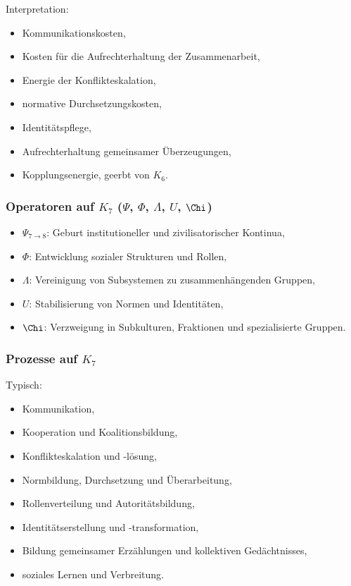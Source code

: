 Interpretation:
\begin{itemize}
    \item Kommunikationskosten,
    \item Kosten für die Aufrechterhaltung der Zusammenarbeit,
    \item Energie der Konflikteskalation,
    \item normative Durchsetzungskosten,
    \item Identitätspflege,
    \item Aufrechterhaltung gemeinsamer Überzeugungen,
    \item Kopplungsenergie, geerbt von $K_6$.
\end{itemize}

\subsubsection{Operatoren auf \texorpdfstring{$K_7$}{K_7} (\texorpdfstring{$\Psi$}{\Psi}, \texorpdfstring{$\Phi$}{\Phi}, \texorpdfstring{$\Lambda$}{\Lambda}, \texorpdfstring{$U$}{U}, \texorpdfstring{$\Chi$}{\Chi})}

\begin{itemize}
    \item $\Psi_{7\to8}$: Geburt institutioneller und zivilisatorischer Kontinua,
    \item $\Phi$: Entwicklung sozialer Strukturen und Rollen,
    \item $\Lambda$: Vereinigung von Subsystemen zu zusammenhängenden Gruppen,
    \item $U$: Stabilisierung von Normen und Identitäten,
    \item $\Chi$: Verzweigung in Subkulturen, Fraktionen und spezialisierte Gruppen.
\end{itemize}

\subsubsection{Prozesse auf \texorpdfstring{$K_7$}{K_7}}

Typisch:
\begin{itemize}
    \item Kommunikation,
    \item Kooperation und Koalitionsbildung,
    \item Konflikteskalation und -lösung,
    \item Normbildung, Durchsetzung und Überarbeitung,
    \item Rollenverteilung und Autoritätsbildung,
    \item Identitätserstellung und -transformation,
    \item Bildung gemeinsamer Erzählungen und kollektiven Gedächtnisses,
    \item soziales Lernen und Verbreitung.
\end{itemize}

